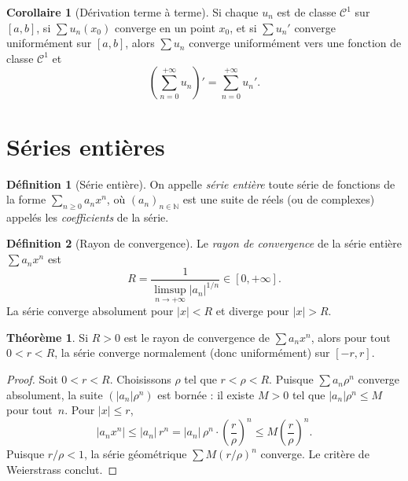 \documentclass[12pt,a4paper,openany]{book}
\theoremstyle{definition}
\newtheorem{definition}{Définition}[chapter]
\newtheorem{theoreme}{Théorème}[chapter]
\newtheorem{corollaire}{Corollaire}[chapter]
\newcommand{\N}{\mathbb{N}}
\newcommand{\abs}[1]{\left\lvert #1 \right\rvert}
\begin{document}
\begin{corollaire}[Dérivation terme à terme]\label{cor:derivation-terme-a-terme}
  Si chaque $u_n$ est de classe $\mathcal{C}^1$ sur $[a,b]$, si $\sum u_n(x_0)$ converge en un point $x_0$, et si $\sum u_n'$ converge uniformément sur $[a,b]$, alors $\sum u_n$ converge uniformément vers une fonction de classe $\mathcal{C}^1$ et
  \[
    \left(\sum_{n=0}^{+\infty} u_n\right)' = \sum_{n=0}^{+\infty} u_n'.
  \]
\end{corollaire}

\section{Séries entières}
\label{sec:series-entieres}

\begin{definition}[Série entière]\label{def:serie-entiere}
  On appelle \emph{série entière} toute série de fonctions de la forme $\sum_{n \geqslant 0} a_n x^n$, où $(a_n)_{n \in \N}$ est une suite de réels (ou de complexes) appelés les \emph{coefficients} de la série.
\end{definition}

\begin{definition}[Rayon de convergence]\label{def:rayon-convergence}
  Le \emph{rayon de convergence} de la série entière $\sum a_n x^n$ est
  \[
    R = \frac{1}{\limsup_{n \to +\infty} \abs{a_n}^{1/n}} \in [0, +\infty].
  \]
  La série converge absolument pour $\abs{x} < R$ et diverge pour $\abs{x} > R$.
\end{definition}

\begin{theoreme}\label{thm:cvu-compact-se}
  Si $R > 0$ est le rayon de convergence de $\sum a_n x^n$, alors pour tout $0 < r < R$, la série converge normalement (donc uniformément) sur $[-r, r]$.
\end{theoreme}

\begin{proof}
  Soit $0 < r < R$. Choisissons $\rho$ tel que $r < \rho < R$. Puisque $\sum a_n \rho^n$ converge absolument, la suite $(\abs{a_n}\rho^n)$ est bornée : il existe $M > 0$ tel que $\abs{a_n}\rho^n \leqslant M$ pour tout~$n$. Pour $\abs{x} \leqslant r$,
  \[
    \abs{a_n x^n} \leqslant \abs{a_n}\, r^n = \abs{a_n}\,\rho^n \cdot \left(\frac{r}{\rho}\right)^n \leqslant M \left(\frac{r}{\rho}\right)^n.
  \]
  Puisque $r/\rho < 1$, la série géométrique $\sum M(r/\rho)^n$ converge. Le critère de Weierstrass conclut.
\end{proof}
\end{document}
